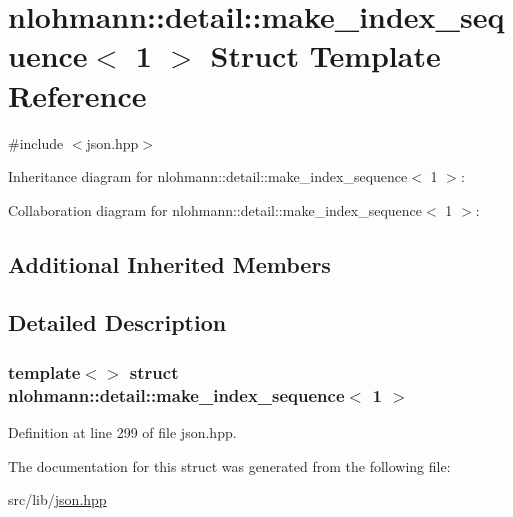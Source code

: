\hypertarget{structnlohmann_1_1detail_1_1make__index__sequence_3_011_01_4}{}\section{nlohmann\+:\+:detail\+:\+:make\+\_\+index\+\_\+sequence$<$ 1 $>$ Struct Template Reference}
\label{structnlohmann_1_1detail_1_1make__index__sequence_3_011_01_4}


{\ttfamily \#include $<$json.\+hpp$>$}



Inheritance diagram for nlohmann\+:\+:detail\+:\+:make\+\_\+index\+\_\+sequence$<$ 1 $>$\+:


Collaboration diagram for nlohmann\+:\+:detail\+:\+:make\+\_\+index\+\_\+sequence$<$ 1 $>$\+:
\subsection*{Additional Inherited Members}


\subsection{Detailed Description}
\subsubsection*{template$<$$>$\newline
struct nlohmann\+::detail\+::make\+\_\+index\+\_\+sequence$<$ 1 $>$}



Definition at line 299 of file json.\+hpp.



The documentation for this struct was generated from the following file\+:\begin{DoxyCompactItemize}
\item 
src/lib/\hyperlink{json_8hpp}{json.\+hpp}\end{DoxyCompactItemize}
